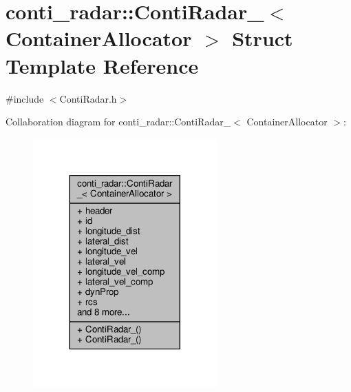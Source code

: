 \hypertarget{structconti__radar_1_1ContiRadar__}{}\section{conti\+\_\+radar\+:\+:Conti\+Radar\+\_\+$<$ Container\+Allocator $>$ Struct Template Reference}
\label{structconti__radar_1_1ContiRadar__}


{\ttfamily \#include $<$Conti\+Radar.\+h$>$}



Collaboration diagram for conti\+\_\+radar\+:\+:Conti\+Radar\+\_\+$<$ Container\+Allocator $>$\+:\nopagebreak
\begin{figure}[H]
\begin{center}
\leavevmode
\includegraphics[width=200pt]{d0/d67/structconti__radar_1_1ContiRadar____coll__graph}
\end{center}
\end{figure}
